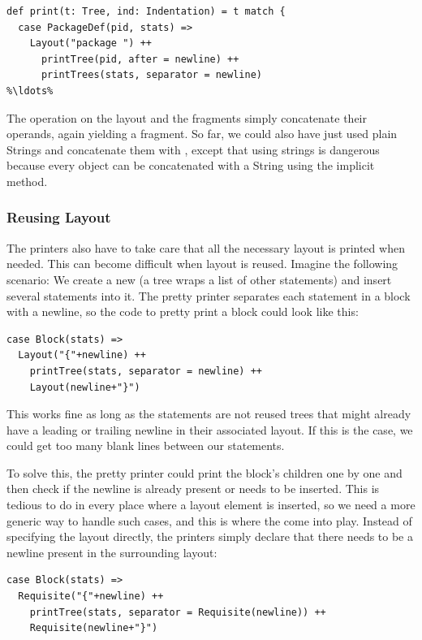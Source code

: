 \begin{lstlisting}
def print(t: Tree, ind: Indentation) = t match {
  case PackageDef(pid, stats) =>
    Layout("package ") ++ 
      printTree(pid, after = newline) ++ 
      printTrees(stats, separator = newline)
%\ldots%
\end{lstlisting}

The \src{++} operation on the layout and the fragments simply concatenate their operands, again yielding a fragment. So far, we could also have just used plain Strings and concatenate them with \src{+}, except that using strings is dangerous because every object can be concatenated with a String using the implicit  method.

\subsubsection{Reusing Layout}

The printers also have to take care that all the necessary layout is printed when needed. This can become difficult when layout is reused. Imagine the following scenario: We create a new  (a  tree wraps a list of other statements) and insert several statements into it. The pretty printer separates each statement in a block with a newline, so the code to pretty print a block could look like this:

\begin{lstlisting}
case Block(stats) =>
  Layout("{"+newline) ++ 
    printTree(stats, separator = newline) ++ 
    Layout(newline+"}")
\end{lstlisting}

This works fine as long as the statements are not reused trees that might already have a leading or trailing newline in their associated layout. If this is the case, we could get too many blank lines between our statements. 

To solve this, the pretty printer could print the block's children one by one and then check if the newline is already present or needs to be inserted. This is tedious to do in every place where a layout element is inserted, so we need a more generic way to handle such cases, and this is where the  come into play. Instead of specifying the layout directly, the printers simply declare that there needs to be a newline present in the surrounding layout:

\begin{lstlisting}
case Block(stats) =>
  Requisite("{"+newline) ++ 
    printTree(stats, separator = Requisite(newline)) ++ 
    Requisite(newline+"}")
\end{lstlisting}

